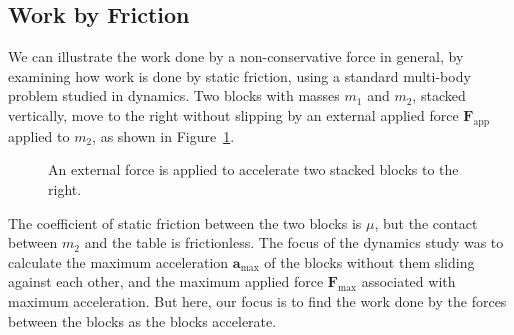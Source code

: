 \subsection{Work by Friction}
We can illustrate the work done by a non-conservative force in general, by
examining how work is done by static friction, using a standard multi-body
problem studied in dynamics. Two blocks with masses $m_1$ and $m_2$, stacked
vertically, move to the right without slipping by an external applied force
$\bm F_\text{app}$ applied to $m_2$, as shown in Figure~\ref{stacked1}.
\begin{figure}[ht]
  \centering
  \caption{An external force is applied to accelerate two stacked blocks to
    the right.}
  \label{stacked1}
\end{figure}
The coefficient of static friction between the two blocks is $\mu$, but the
contact between $m_2$ and the table is frictionless. The focus of the dynamics
study was to calculate the maximum acceleration $\bm a_\text{max}$ of the
blocks without them sliding against each other, and the maximum applied force
$\bm F_\text{max}$ associated with maximum acceleration. But here, our focus is
to find the work done by the forces between the blocks as the blocks
accelerate.

